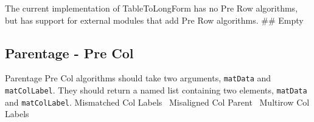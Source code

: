 \documentclass[a4paper]{article}
\begin{document}
The current implementation of TableToLongForm has no Pre Row
algorithms, but has support for external modules that add Pre Row
algorithms.
\nwenddocs{}\endmoddef
## Empty
\nwendcode{}\nwdocspar

\subsection{Parentage - Pre Col}
Parentage Pre Col algorithms should take two arguments, \verb|matData|
and \verb|matColLabel|. They should return a named list containing two
elements, \verb|matData| and \verb|matColLabel|.
\nwenddocs{}\endmoddef
\LA{}Mismatched Col Labels~{\nwtagstyle{}}\RA{}
\LA{}Misaligned Col Parent~{\nwtagstyle{}}\RA{}
\LA{}Multirow Col Labels~{\nwtagstyle{}}\RA{}
\nwendcode{}\nwdocspar
\end{document}
